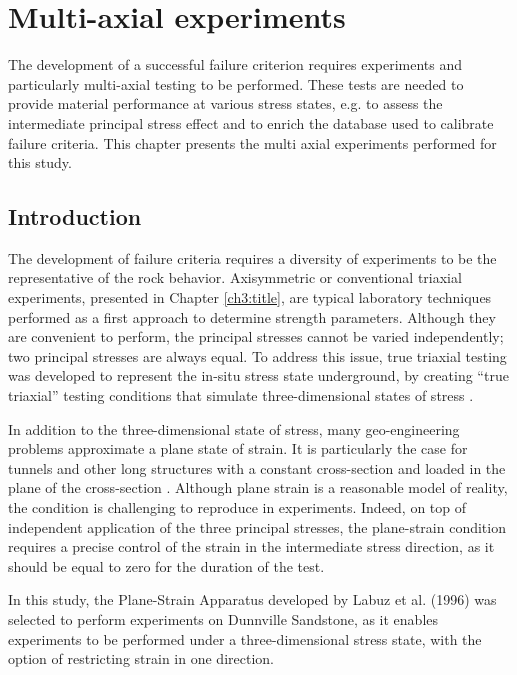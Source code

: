 \chapter{Multi-axial experiments}\label{ch4:title}

The development of a successful failure criterion requires experiments and particularly multi-axial testing \cite{Labuz2018} to be performed. These tests are needed to provide material performance at various stress states, e.g. to assess the intermediate principal stress effect and to enrich the database used to calibrate failure criteria. This chapter presents the multi axial experiments performed for this study. 


\section{Introduction}

The development of failure criteria requires a diversity of experiments to be the representative of the rock behavior. Axisymmetric or conventional triaxial experiments, presented in Chapter \ref{ch3:title}, are typical laboratory techniques performed as a first approach to determine strength parameters. Although they are convenient to perform, the principal stresses cannot be varied independently; two principal stresses are always equal. To address this issue, true triaxial testing was developed to represent the in-situ stress state underground, by creating “true triaxial” testing conditions that simulate three-dimensional states of stress \cite{Labuz2018} .

In addition to the three-dimensional state of stress, many geo-engineering problems approximate a plane state of strain. It is particularly the case for tunnels and other long structures with a constant cross-section and loaded in the plane of the cross-section \cite{Jaeger1979}. Although plane strain is a reasonable model of reality, the condition is challenging to reproduce in experiments. Indeed, on top of independent application of the three principal stresses, the plane-strain condition requires a precise control of the strain in the intermediate stress direction, as it should be equal to zero for the duration of the test. 

In this study, the Plane-Strain Apparatus developed by Labuz et al. (1996) \cite{Labuz1996} was selected to perform experiments on Dunnville Sandstone, as it enables experiments to be performed under a three-dimensional stress state, with the option of restricting strain in one direction.


